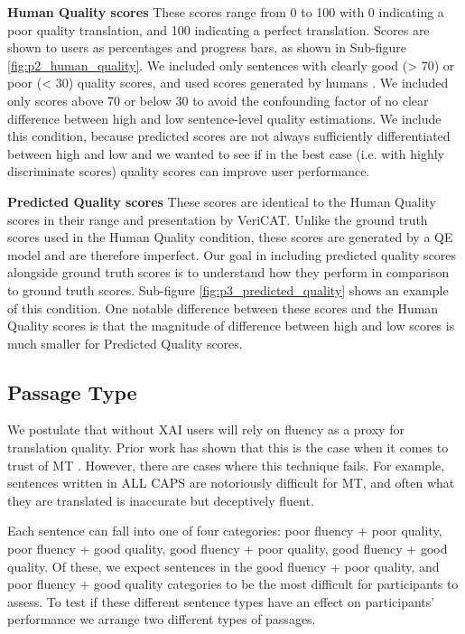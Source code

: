 \begin{compacthang}
    \item \textbf{Human Quality scores} These scores range from 0 to 100 with 0 indicating a poor quality translation, and 100 indicating a perfect translation. Scores are shown to users as percentages and progress bars, as shown in Sub-figure \ref{fig:p2_human_quality}. We included only sentences with clearly good (> 70) or poor (< 30) quality scores, and used scores generated by humans . We included only scores above 70 or below 30 to avoid the confounding factor of no clear difference between high and low sentence-level quality estimations. We include this condition, because predicted scores are not always sufficiently differentiated between high and low and we wanted to see if in the best case (i.e. with highly discriminate scores) quality scores can improve user performance.  

    \item \textbf{Predicted Quality scores} These scores are identical to the Human Quality scores in their range and presentation by VeriCAT. Unlike the ground truth scores used in the Human Quality condition, these scores are generated by a QE model and are therefore imperfect. Our goal in including predicted quality scores alongside ground truth scores is to understand how they perform in comparison to ground truth scores. Sub-figure \ref{fig:p3_predicted_quality} shows an example of this condition. One notable difference between these scores and the Human Quality scores is that the magnitude of difference between high and low scores is much smaller for Predicted Quality scores.   
    
\end{compacthang}

\subsection{Passage Type}
We postulate that without XAI users will rely on fluency as a proxy for translation quality. Prior work has shown that this is the case when it comes to trust of MT \cite{martindaleFluency2018}. However, there are cases where this technique fails. For example, sentences written in ALL CAPS are notoriously difficult for MT, and often what they are translated is inaccurate but deceptively fluent. 

Each sentence can fall into one of four categories: poor fluency + poor quality, poor fluency + good quality, good fluency + poor quality, good fluency + good quality. Of these, we expect  sentences in the good fluency + poor quality, and poor fluency + good quality categories to be the most difficult for participants to assess. To test if these different sentence types have an effect on participants’ performance we arrange two different types of passages. 

